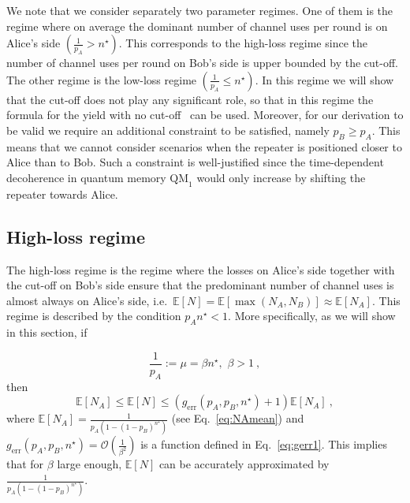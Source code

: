 \documentclass[aps,pra,reprint,superscriptaddress]{revtex4-1}
\newcommand{\nstar}{n^{\star}}
\begin{document}
We note that we consider separately two parameter regimes. One
of them is the regime where on average the dominant number of channel
uses per round is on Alice's side $\left(\frac{1}{p_A}> \nstar \right)$. This corresponds to the high-loss
regime since the number of channel uses per round on Bob's side is
upper bounded by the cut-off. The other regime is the low-loss regime $\left(\frac{1}{p_A}\leq\nstar \right)$.
In this regime we will show that the cut-off does not play any significant role, so that in this regime the formula for the yield with no cut-off~\cite{panayi2014memory, luong2015overcoming} can be used. Moreover, for our derivation to be valid we require an additional constraint to be satisfied, namely $p_B \ge p_A$. This means that we cannot consider scenarios when the repeater is positioned closer to Alice than to Bob. Such a constraint is well-justified since the time-dependent decoherence in quantum memory $\textrm{QM}_1$ would only increase by shifting the repeater towards Alice.

\subsection*{High-loss regime} 
The high-loss regime is the regime where the losses on Alice's side together with the cut-off on Bob's side ensure that the predominant number of channel uses is almost always on Alice's side, i.e.~$\mathbb{E}\left[N\right] = \mathbb{E}\left[\max(N_A, N_B)\right] \approx \mathbb{E}\left[N_A\right]$. This regime is described by the condition $p_A \nstar < 1$. More specifically, as we will show in this section, if

\begin{equation}
\frac{1}{p_A}:= \mu = \beta \nstar, \, \, \beta>1\ ,
\label{eq:approxcond}
\end{equation}
then
\begin{equation}
\mathbb{E}[N_A]  \leq \mathbb{E}\left[N\right] \leq  \left(g_\text{err}(p_A, p_B, \nstar) +1\right) \mathbb{E}[N_A]\label{eq:hlcondition}\ ,
\end{equation}
where $\mathbb{E}[N_A] = \frac{1}{p_A (1-(1-p_B)^{\nstar})}$ (see Eq.~\eqref{eq:NAmean}) and $g_\text{err}(p_A, p_B, \nstar) = \mathcal{O}\left(\frac{1}{\beta^2}\right)$ is a function defined in Eq.~\eqref{eq:gerr1}. This implies that for $\beta$ large enough, $\mathbb{E}\left[N\right]$ can be accurately approximated by $\frac{1}{p_A (1-(1-p_B)^{\nstar})}$.\\
\end{document}
